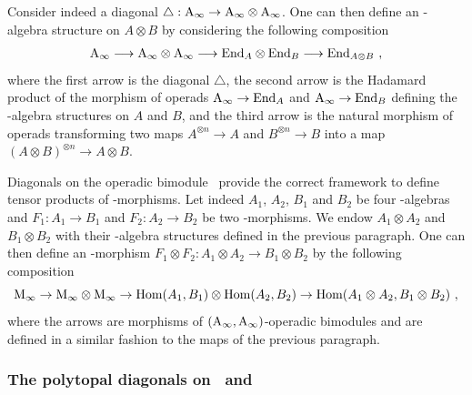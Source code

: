 \documentclass[twoside, 12pt]{amsart}
\theoremstyle{remark}
\begin{document}
Consider indeed a diagonal $\triangle : \mathrm{A}_\infty \rightarrow \mathrm{A}_\infty \otimes \mathrm{A}_\infty$. One can then define an \Ainf -algebra structure on $A \otimes B$ by considering the following composition
\[ \mathrm{A}_\infty \longrightarrow \mathrm{A}_\infty \otimes \mathrm{A}_\infty \longrightarrow \mathrm{End}_A \otimes \mathrm{End}_B \longrightarrow \mathrm{End}_{A \otimes B} \ , \]
where the first arrow is the diagonal $\triangle$, the second arrow is the Hadamard product of the morphism of operads $\mathrm{A}_\infty \rightarrow \mathrm{End}_A$ and $\mathrm{A}_\infty \rightarrow \mathrm{End}_B$ defining the \Ainf -algebra structures on $A$ and $B$, and the third arrow is the natural morphism of operads transforming two maps $A^{\otimes n} \rightarrow A$ and $B^{\otimes n} \rightarrow B$ into a map $(A\otimes B)^{\otimes n} \rightarrow A \otimes B$.

Diagonals on the operadic bimodule \Minf\ provide the correct framework to define tensor products of \Ainf -morphisms. Let indeed $A_1$, $A_2$, $B_1$ and $B_2$ be four \Ainf -algebras and $F_1 : A_1 \rightarrow B_1$ and $F_2 : A_2 \rightarrow B_2$ be two \Ainf -morphisms. We endow $A_1 \otimes A_2$ and $B_1 \otimes B_2$ with their \Ainf -algebra structures defined in the previous paragraph. 
One can then define an \Ainf -morphism $F_1 \otimes F_2 : A_1 \otimes A_2 \rightarrow B_1 \otimes B_2$ by the following composition
\[ \Minf \rightarrow \Minf \otimes \Minf \rightarrow \Hom (A_1 , B_1) \otimes \Hom (A_2,B_2) \rightarrow  \Hom (A_1 \otimes A_2 , B_1 \otimes B_2) \ , \]
where the arrows are morphisms of $(\mathrm{A}_\infty , \mathrm{A}_\infty )$-operadic bimodules and are defined in a similar fashion to the maps of the previous paragraph.

\subsubsection{The polytopal diagonals on \Ainf\ and \Minf}

\end{document}
